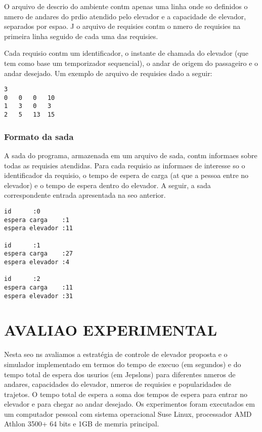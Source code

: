 \documentclass[12pt]{article}
\begin{document}
O arquivo de descrio do ambiente contm apenas uma linha onde so definidos o nmero de andares do prdio atendido pelo elevador e a capacidade de elevador, separados por espao. J o arquivo de requisies contm o nmero de requisies na primeira linha seguido de cada uma das requisies.

Cada requisio contm um identificador, o instante de chamada do elevador (que tem como base um temporizador sequencial), o andar de origem do passageiro e o andar desejado. Um exemplo de arquivo de requisies  dado a seguir:

\begin{footnotesize}
\begin{verbatim}
3
0	0	0	10
1	3	0	3
2	5	13	15
\end{verbatim}
\end{footnotesize}

\subsubsection{Formato da sada}

A sada do programa, armazenada em um arquivo de sada, contm informaes sobre todas as requisies atendidas.  Para cada requisio as informaes de interesse so o identificador da requisio, o tempo de espera de carga (at que a pessoa entre no elevador) e o tempo de espera dentro do elevador. A seguir, a sada correspondente  entrada apresentada na seo anterior.

\begin{footnotesize}
\begin{verbatim}
id		:0
espera carga	:1
espera elevador	:11

id		:1
espera carga	:27
espera elevador	:4

id		:2
espera carga	:11
espera elevador	:31
\end{verbatim}
\end{footnotesize}


\section{AVALIAO EXPERIMENTAL}
\label{avaliacao_experimental}


Nesta seo ns avaliamos a estratégia de controle de elevador proposta e o simulador implementado em termos do tempo de execuo (em segundos) e do tempo total de espera dos usurios (em Jepslons) para diferentes nmeros de andares, capacidades do elevador, nmeros de requisies e popularidades de trajetos. O tempo total de espera  a soma dos tempos de espera para entrar no elevador e para chegar ao andar desejado. Os experimentos foram executados em um computador pessoal com sistema operacional Suse Linux, processador AMD Athlon 3500+ 64 bits e 1GB de memria principal.
\end{document}
